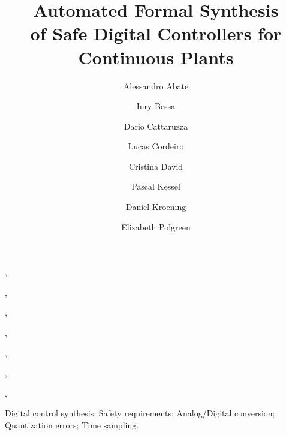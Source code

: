 \documentclass[twocolumn]{autart}    %
\begin{document}
\newcommand\tool{{\sf DSSynth}}
\begin{frontmatter}



\title{Automated Formal Synthesis\\ 
of Safe Digital Controllers 
for Continuous Plants}


\author[oxford]{Alessandro Abate},
\author[manaus]{Iury Bessa},
\author[oxford]{Dario Cattaruzza},
\author[manchester]{Lucas Cordeiro},
\author[cambridge]{Cristina David},
\author[oxford]{Pascal Kessel},
\author[oxford]{Daniel Kroening},
\author[oxford]{Elizabeth Polgreen}

\address[oxford]{University of Oxford, UK}
\address[cambridge]{University of Cambridge, UK}
\address[manchester]{University of Manchester, UK}
\address[manaus]{Federal University of Amazonas, Brazil} 
          
\begin{keyword}                           %
Digital control synthesis; Safety requirements; Analog/Digital conversion; Quantization errors; Time sampling.               %
\end{keyword}                             %




\end{frontmatter}
\end{document}
